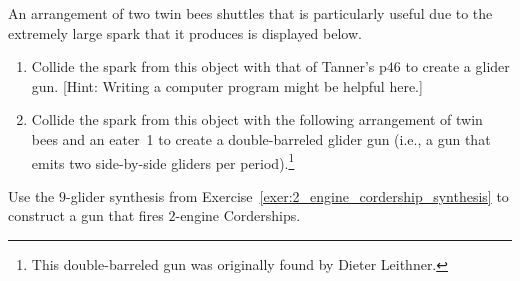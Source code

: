 \begin{multicols}{2}
\mfilbreak


\begin{problem}\label{exer:twin_bees_large_spark}
	An arrangement of two twin bees shuttles that is particularly useful due to the extremely large spark that it produces is displayed below.
	
	\begin{center}
	\end{center}
	
	\begin{enumerate}[label=\bf\color{ocre}(\alph*)]
		\item Collide the spark from this object with that of Tanner's p$46$ to create a glider gun. [Hint: Writing a computer program might be helpful here.]
		
		\item Collide the spark from this object with the following arrangement of twin bees and an eater~1 to create a double-barreled glider gun (i.e., a gun that emits two side-by-side gliders per period).\footnote{This double-barreled gun was originally found by Dieter Leithner.}
		
		\begin{center}
		\end{center}
	\end{enumerate}
\end{problem}


\mfilbreak


\begin{problem}\label{exer:2eng_corder_gun}
	Use the $9$-glider synthesis from Exercise~\ref{exer:2_engine_cordership_synthesis} to construct a gun that fires $2$-engine Corderships.
\end{problem}



\end{multicols}

